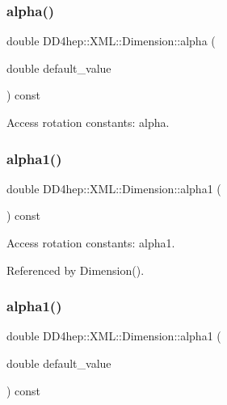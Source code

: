 \subsubsection{\texorpdfstring{alpha()}{alpha()}\hspace{0.1cm}{\footnotesize\ttfamily [2/2]}}
{\footnotesize\ttfamily double D\+D4hep\+::\+X\+M\+L\+::\+Dimension\+::alpha (\begin{DoxyParamCaption}\item[{double}]{default\+\_\+value }\end{DoxyParamCaption}) const}



Access rotation constants\+: alpha. 

\hypertarget{struct_d_d4hep_1_1_x_m_l_1_1_dimension_a85be000bc2acf3dac7cbd8dd2455170e}{}\label{struct_d_d4hep_1_1_x_m_l_1_1_dimension_a85be000bc2acf3dac7cbd8dd2455170e} 
\subsubsection{\texorpdfstring{alpha1()}{alpha1()}\hspace{0.1cm}{\footnotesize\ttfamily [1/2]}}
{\footnotesize\ttfamily double D\+D4hep\+::\+X\+M\+L\+::\+Dimension\+::alpha1 (\begin{DoxyParamCaption}{ }\end{DoxyParamCaption}) const}



Access rotation constants\+: alpha1. 



Referenced by Dimension().

\hypertarget{struct_d_d4hep_1_1_x_m_l_1_1_dimension_a20a08c7dcdd420901b45662eaba04a72}{}\label{struct_d_d4hep_1_1_x_m_l_1_1_dimension_a20a08c7dcdd420901b45662eaba04a72} 
\subsubsection{\texorpdfstring{alpha1()}{alpha1()}\hspace{0.1cm}{\footnotesize\ttfamily [2/2]}}
{\footnotesize\ttfamily double D\+D4hep\+::\+X\+M\+L\+::\+Dimension\+::alpha1 (\begin{DoxyParamCaption}\item[{double}]{default\+\_\+value }\end{DoxyParamCaption}) const}



